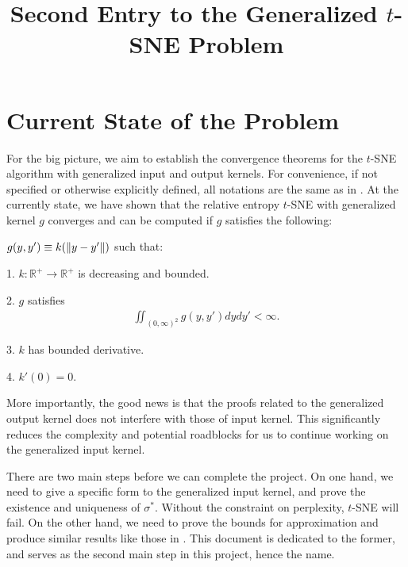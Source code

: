 \documentclass[10pt]{article}
\begin{document}
\title{Second Entry to the Generalized \texorpdfstring{$t$}{Lg}-SNE Problem}
\maketitle

\section{Current State of the Problem}
For the big picture, we aim to establish the convergence theorems for the
$t$-SNE algorithm with generalized input and output kernels. For convenience,
if not specified or otherwise explicitly defined, all notations are the same as
in \citep{auffinger-tsne}. At the currently state, we have shown that the
relative entropy $t$-SNE with generalized kernel $g$ converges and can be
computed if $g$ satisfies the following:

$g(y,y') \equiv k (\left\lVert y-y'\right\rVert)$ such that:

1. $k: \mathbb{R}^+ \to \mathbb{R}^+$ is decreasing and bounded.

2. $g$ satisfies
\begin{align}
    \iint_{(0,\infty)^2} g(y,y') dy dy' < \infty.
\end{align}

3. $k$ has bounded derivative.

4. $k'(0) = 0$.

More importantly, the good news is that the proofs related to the generalized
output kernel does not interfere with those of input kernel. This significantly
reduces the complexity and potential roadblocks for us to continue working on
the generalized input kernel.

There are two main steps before we can complete the project. On one hand, we
need to give a specific form to the generalized input kernel, and prove the
existence and uniqueness of $\sigma^*$. Without the constraint on perplexity,
$t$-SNE will fail. On the other hand, we need to prove the bounds for
approximation and produce similar results like those in \citep{auffinger-tsne}.
This document is dedicated to the former, and serves as the second main step in
this project, hence the name.
\end{document}

